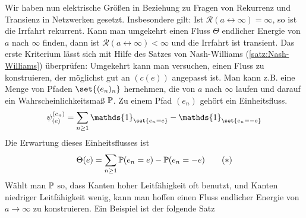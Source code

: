 Wir haben nun elektrische Größen in Beziehung zu Fragen von Rekurrenz und Transienz in Netzwerken gesetzt. Insbesondere gilt: Ist $\mathcal{R}(a \leftrightarrow \infty)  = \infty $, so ist die Irrfahrt rekurrent. Kann man umgekehrt einen Fluss $\Theta$ endlicher Energie von $a$ nach $\infty$ finden, dann ist $\mathcal{R}(a \leftrightarrow \infty)< \infty$ und die Irrfahrt ist transient. Das erste Kriterium lässt sich mit Hilfe des Satzes von Nash-Williams (\ref{satz:Nash-Williams}) überprüfen: Umgekehrt kann man versuchen, einen Fluss zu konstruieren, der möglichst gut an $(c(e))$ angepasst ist. Man kann z.B. eine Menge von Pfaden $\set{(e_n)_n}$ hernehmen, die von $a$ nach $\infty$ laufen und darauf ein Wahrscheinlichkeitsmaß $\mathbb{P}$. Zu einem Pfad $(e_n)$ gehört ein Einheitsfluss. 
\begin{align}
\psi^{(e_n)}_{(e)} = \sum\limits_{n \geq 1} \mathds{1}_{\set{e_n = e}} - \mathds{1}_{\set{e_n = -e}}
\end{align}
Die Erwartung dieses Einheitsflusses ist
\begin{gather}
\Theta(e) = \sum\limits_{n \geq 1} \prop{e_n = e} - \prop{e_n = -e} \tag{$*$}\label{eqn:4-1}
\end{gather}
Wählt man $\mathbb{P}$ so, dass Kanten hoher Leitfähigkeit oft benutzt, und Kanten niedriger Leitfähigkeit wenig, kann man hoffen einen Fluss endlicher Energie von $a \to \infty$ zu konstruieren. Ein Beispiel ist der folgende Satz


